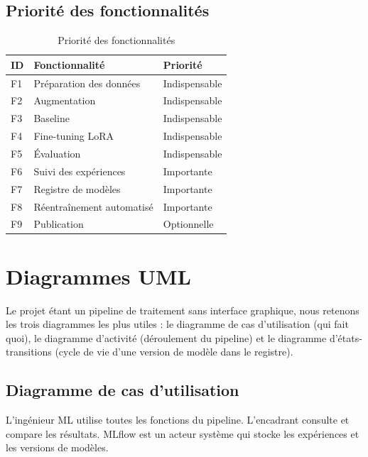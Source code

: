 \documentclass[12pt,a4paper]{report}
\begin{document}
\section{Priorité des fonctionnalités}
\begin{table}[h]
  \centering
  \small
  \begin{tabular}{lll}
    \toprule
    \textbf{ID} & \textbf{Fonctionnalité} & \textbf{Priorité} \\
    \midrule
    F1 & Préparation des données    & Indispensable \\
    F2 & Augmentation               & Indispensable \\
    F3 & Baseline                   & Indispensable \\
    F4 & Fine-tuning LoRA           & Indispensable \\
    F5 & Évaluation                 & Indispensable \\
    F6 & Suivi des expériences      & Importante \\
    F7 & Registre de modèles        & Importante \\
    F8 & Réentraînement automatisé  & Importante \\
    F9 & Publication                & Optionnelle \\
    \bottomrule
  \end{tabular}
  \caption{Priorité des fonctionnalités}
  \label{tab:priorites}
\end{table}

\chapter{Diagrammes UML}

Le projet étant un pipeline de traitement sans interface graphique, nous retenons
les trois diagrammes les plus utiles : le diagramme de cas d'utilisation (qui fait
quoi), le diagramme d'activité (déroulement du pipeline) et le diagramme
d'états-transitions (cycle de vie d'une version de modèle dans le registre).

\section{Diagramme de cas d'utilisation}
L'ingénieur ML utilise toutes les fonctions du pipeline. L'encadrant consulte et
compare les résultats. MLflow est un acteur système qui stocke les expériences et
les versions de modèles.
\end{document}
